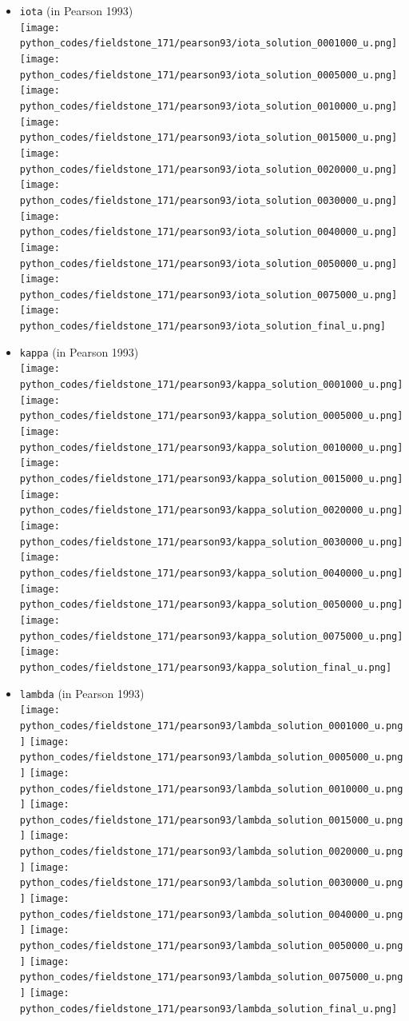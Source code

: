 \begin{itemize}
\item {\tt iota} (in Pearson 1993)\\
\texttt{[image: python\_codes/fieldstone\_171/pearson93/iota\_solution\_0001000\_u.png]}
\texttt{[image: python\_codes/fieldstone\_171/pearson93/iota\_solution\_0005000\_u.png]}
\texttt{[image: python\_codes/fieldstone\_171/pearson93/iota\_solution\_0010000\_u.png]}
\texttt{[image: python\_codes/fieldstone\_171/pearson93/iota\_solution\_0015000\_u.png]}
\texttt{[image: python\_codes/fieldstone\_171/pearson93/iota\_solution\_0020000\_u.png]}
\texttt{[image: python\_codes/fieldstone\_171/pearson93/iota\_solution\_0030000\_u.png]}
\texttt{[image: python\_codes/fieldstone\_171/pearson93/iota\_solution\_0040000\_u.png]}
\texttt{[image: python\_codes/fieldstone\_171/pearson93/iota\_solution\_0050000\_u.png]}
\texttt{[image: python\_codes/fieldstone\_171/pearson93/iota\_solution\_0075000\_u.png]}
\texttt{[image: python\_codes/fieldstone\_171/pearson93/iota\_solution\_final\_u.png]}
\item {\tt kappa} (in Pearson 1993)\\
\texttt{[image: python\_codes/fieldstone\_171/pearson93/kappa\_solution\_0001000\_u.png]}
\texttt{[image: python\_codes/fieldstone\_171/pearson93/kappa\_solution\_0005000\_u.png]}
\texttt{[image: python\_codes/fieldstone\_171/pearson93/kappa\_solution\_0010000\_u.png]}
\texttt{[image: python\_codes/fieldstone\_171/pearson93/kappa\_solution\_0015000\_u.png]}
\texttt{[image: python\_codes/fieldstone\_171/pearson93/kappa\_solution\_0020000\_u.png]}
\texttt{[image: python\_codes/fieldstone\_171/pearson93/kappa\_solution\_0030000\_u.png]}
\texttt{[image: python\_codes/fieldstone\_171/pearson93/kappa\_solution\_0040000\_u.png]}
\texttt{[image: python\_codes/fieldstone\_171/pearson93/kappa\_solution\_0050000\_u.png]}
\texttt{[image: python\_codes/fieldstone\_171/pearson93/kappa\_solution\_0075000\_u.png]}
\texttt{[image: python\_codes/fieldstone\_171/pearson93/kappa\_solution\_final\_u.png]}

\item {\tt lambda} (in Pearson 1993)\\
\texttt{[image: python\_codes/fieldstone\_171/pearson93/lambda\_solution\_0001000\_u.png]}
\texttt{[image: python\_codes/fieldstone\_171/pearson93/lambda\_solution\_0005000\_u.png]}
\texttt{[image: python\_codes/fieldstone\_171/pearson93/lambda\_solution\_0010000\_u.png]}
\texttt{[image: python\_codes/fieldstone\_171/pearson93/lambda\_solution\_0015000\_u.png]}
\texttt{[image: python\_codes/fieldstone\_171/pearson93/lambda\_solution\_0020000\_u.png]}
\texttt{[image: python\_codes/fieldstone\_171/pearson93/lambda\_solution\_0030000\_u.png]}
\texttt{[image: python\_codes/fieldstone\_171/pearson93/lambda\_solution\_0040000\_u.png]}
\texttt{[image: python\_codes/fieldstone\_171/pearson93/lambda\_solution\_0050000\_u.png]}
\texttt{[image: python\_codes/fieldstone\_171/pearson93/lambda\_solution\_0075000\_u.png]}
\texttt{[image: python\_codes/fieldstone\_171/pearson93/lambda\_solution\_final\_u.png]}


\end{itemize}
